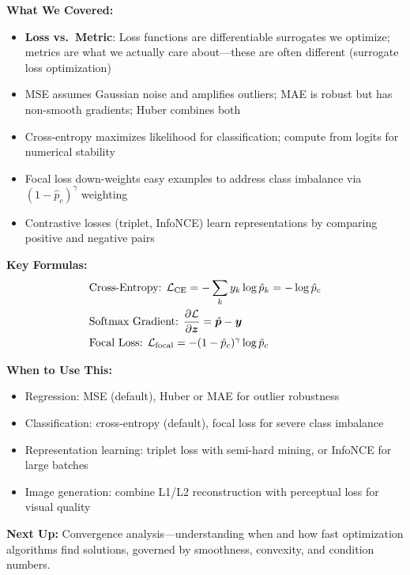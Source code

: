 \documentclass[../../main.tex]{subfiles}
\begin{document}
\begin{chaptersummary}
\textbf{What We Covered:}
\begin{itemize}
    \item \textbf{Loss vs.\ Metric}: Loss functions are differentiable surrogates we optimize; metrics are what we actually care about---these are often different (surrogate loss optimization)
    \item MSE assumes Gaussian noise and amplifies outliers; MAE is robust but has non-smooth gradients; Huber combines both
    \item Cross-entropy maximizes likelihood for classification; compute from logits for numerical stability
    \item Focal loss down-weights easy examples to address class imbalance via $(1-\hat{p}_c)^\gamma$ weighting
    \item Contrastive losses (triplet, InfoNCE) learn representations by comparing positive and negative pairs
\end{itemize}

\textbf{Key Formulas:}
\begin{align*}
    &\text{Cross-Entropy: } \mathcal{L}_{\text{CE}} = -\sum_{k} y_k \log \hat{p}_k = -\log \hat{p}_c \\
    &\text{Softmax Gradient: } \frac{\partial \mathcal{L}}{\partial \boldsymbol{z}} = \hat{\boldsymbol{p}} - \boldsymbol{y} \\
    &\text{Focal Loss: } \mathcal{L}_{\text{focal}} = -(1-\hat{p}_c)^\gamma \log \hat{p}_c
\end{align*}

\textbf{When to Use This:}
\begin{itemize}
    \item Regression: MSE (default), Huber or MAE for outlier robustness
    \item Classification: cross-entropy (default), focal loss for severe class imbalance
    \item Representation learning: triplet loss with semi-hard mining, or InfoNCE for large batches
    \item Image generation: combine L1/L2 reconstruction with perceptual loss for visual quality
\end{itemize}

\textbf{Next Up:} Convergence analysis---understanding when and how fast optimization algorithms find solutions, governed by smoothness, convexity, and condition numbers.
\end{chaptersummary}
\end{document}
